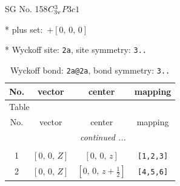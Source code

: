 \documentclass[fleqn,8pt]{jsarticle}
\begin{document}
\setcounter{MaxMatrixCols}{32}

\renewcommand{\tablename}{Table~}
\renewcommand{\figurename}{Figure~}
\begin{center}
\LARGE
SG No. 158\quad$C_{\rm 3v}^{3}$\quad$P3c1$\quad[ trigonal ]
\end{center}

* plus set:\,\,\,$+\left[ 0,\, 0,\, 0 \right]$


* Wyckoff site: {\tt 2a}, site symmetry: {\tt 3..}
\renewcommand{\arraystretch}{1.2}
\begin{longtable}{cccc}
\caption{Wyckoff bond: {\tt 2a@2a}, bond symmetry: {\tt 3..}}
 \\
 \hline \hline
No. & vector & center & mapping \\ \hline \endfirsthead

\multicolumn{3}{l}{\tablename\ \thetable{}} \\
 \hline \hline
No. & vector & center & mapping \\ \hline \endhead

 \hline \hline
\multicolumn{3}{r}{\footnotesize\it continued ...} \\ \endfoot

 \hline \hline
\multicolumn{3}{r}{} \\ \endlastfoot

1 & $\left[ 0,\, 0,\, Z \right]$ & $\left[ 0,\, 0,\, z \right]$ & {\tt [1,2,3]} \\ \hline
2 & $\left[ 0,\, 0,\, Z \right]$ & $\left[ 0,\, 0,\, z + \frac{1}{2} \right]$ & {\tt [4,5,6]} \\
\end{longtable}
\renewcommand{\arraystretch}{1.2}
\end{document}
